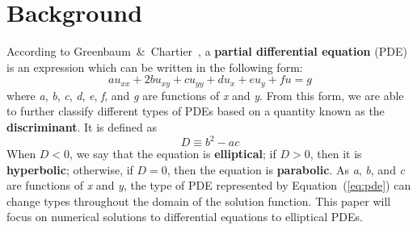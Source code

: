 \documentclass[12pt, titlepage]{article}
\title{\mytitle}
\author{Jaden Nola}
\date{2 May 2023}
\begin{document}
    \maketitle
    \section*{Background}
    According to Greenbaum~\&~Chartier~\cite{greenbaum}, a \textbf{partial differential equation} (PDE) is an expression which can be written
    in the following form:
    \begin{equation}\label{eq:pde}
        au_{xx} + 2bu_{xy} + cu_{yy} + du_{x} + eu_{y} + fu = g
    \end{equation}
    where \textit{a}, \textit{b}, \textit{c}, \textit{d}, \textit{e}, \textit{f}, and \textit{g} are functions of \textit{x} and \textit{y}.
    From this form, we are able to further classify different types of PDEs based on a quantity known as
    the \textbf{discriminant}. It is defined as
    \begin{equation}
        D \equiv b^2 - ac
    \end{equation}
    When $D < 0$, we say that the equation is \textbf{elliptical}; if $D > 0$, then it is \textbf{hyperbolic}; 
    otherwise, if $D = 0$, then the equation is \textbf{parabolic}. As \textit{a}, \textit{b}, and \textit{c} are functions of \textit{x} and \textit{y},
    the type of PDE represented by Equation~(\ref{eq:pde}) can change types throughout the domain of the solution function.
    This paper will focus on numerical solutions to differential equations to elliptical PDEs.  
    \newpage 
    
    {}
\end{document}

